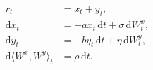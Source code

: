 \documentclass{equation-sheet}
\begin{document}
\begin{equation*}
\begin{aligned}
r_t &= x_t+y_t, \\[0.5em]
\mathrm{d}x_t
  &= -a x_t\,\mathrm{d}t + \sigma\,\mathrm{d}W_t^x, \\[0.5em]
\mathrm{d}y_t
  &= -b y_t\,\mathrm{d}t + \eta\,\mathrm{d}W_t^y, \\[0.5em]
\mathrm{d}\langle W^x,W^y\rangle_t
  &= \rho\,\mathrm{d}t.
\end{aligned}
\end{equation*}
\end{document}
